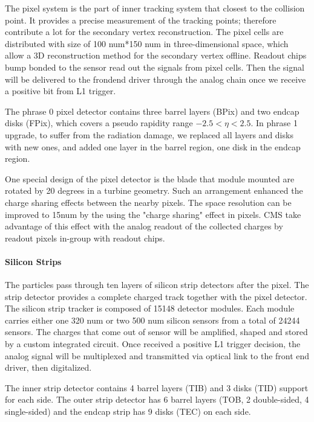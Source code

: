 The pixel system is the part of inner tracking system that closest to the collision point. It provides a precise measurement of the tracking points; therefore contribute a lot for the secondary vertex reconstruction. The pixel cells are distributed with size of 100 num*150 num in three-dimensional space, which allow a 3D reconstruction method for the secondary vertex offline. Readout chips bump bonded to the sensor read out the signals from pixel cells. Then the signal will be delivered to the frondend driver through the analog chain once we receive a positive bit from L1 trigger.

The phrase 0 pixel detector contains three barrel layers (BPix) and two endcap disks (FPix), which covers a pseudo rapidity range $-2.5<\eta<2.5$. In phrase 1 upgrade, to suffer from the radiation damage, we replaced all layers and disks with new ones, and added one layer in the barrel region, one disk in the endcap region.

One special design of the pixel detector is the blade that module mounted are rotated by 20 degrees in a turbine geometry. Such an arrangement enhanced the charge sharing effects between the nearby pixels. The space resolution can be improved to 15num by the using the "charge sharing" effect in pixels. CMS take advantage of this effect with the analog readout of the collected charges by readout pixels in-group with readout chips. 

\paragraph{Silicon Strips}

The particles pass through ten layers of silicon strip detectors after the pixel. The strip detector provides a complete charged track together with the pixel detector. The silicon strip tracker is composed of 15148 detector modules. Each module carries either one 320 num or two 500 num silicon sensors from a total of 24244 sensors. The charges that come out of sensor will be amplified, shaped and stored by a custom integrated circuit. Once received a positive L1 trigger decision, the analog signal will be multiplexed and transmitted via optical link to the front end driver, then digitalized. 

The inner strip detector contains 4 barrel layers (TIB) and 3 disks (TID) support for each side. The outer strip detector has 6 barrel layers (TOB, 2 double-sided, 4 single-sided) and the endcap strip has 9 disks (TEC) on each side.


